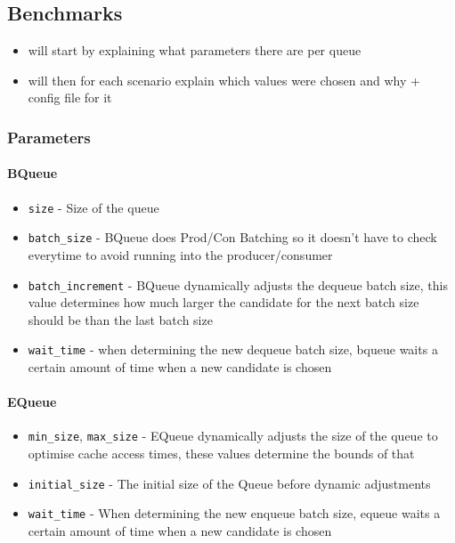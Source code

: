 \subsection{Benchmarks}
\begin{itemize}
    \item will start by explaining what parameters there are per queue
    \item will then for each scenario explain which values were chosen and why + config file for it
\end{itemize}

\subsubsection{Parameters}
\paragraph{BQueue}
\begin{itemize}
    \item \texttt{size} - Size of the queue
    \item \texttt{batch\_size} - BQueue does Prod/Con Batching so it doesn't have to check everytime to avoid
        running into the producer/consumer
    \item \texttt{batch\_increment} - BQueue dynamically adjusts the dequeue batch size, this value
        determines how much larger the candidate for the next batch size should be than the last batch size
    \item \texttt{wait\_time} - when determining the new dequeue batch size, bqueue waits a certain amount of
        time when a new candidate is chosen
\end{itemize}

\paragraph{EQueue}
\begin{itemize}
    \item \texttt{min\_size}, \texttt{max\_size} - EQueue dynamically adjusts the size of the queue to
        optimise cache access times, these values determine the bounds of that
    \item \texttt{initial\_size} - The initial size of the Queue before dynamic adjustments
    \item \texttt{wait\_time} - When determining the new enqueue batch size, equeue waits a certain amount of
        time when a new candidate is chosen
\end{itemize}

